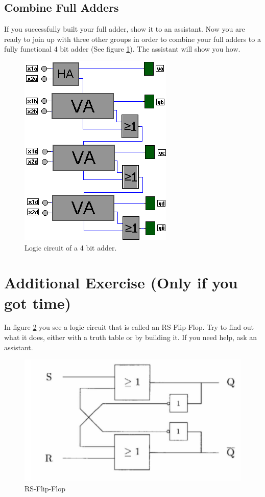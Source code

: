 \documentclass[10pt,a4paper]{article}
\begin{document}
\subsection{Combine Full Adders}
If you successfully built your full adder, show it to an assistant. Now you are ready to join up with three other groups in order to combine your full adders to a fully functional 4 bit adder (See figure \ref{fig:4bit}). The assistant will show you how.
\begin{figure}[H]
	\centering		  
	\includegraphics[scale=0.5]{4bit}
	\caption{Logic circuit of a 4 bit adder.}
	\label{fig:4bit}
\end{figure}


\section{Additional Exercise (Only if you got time)}
In figure \ref{fig:RSFF} you see a logic circuit that is called an RS Flip-Flop. Try to find out what it does, either with a truth table or by building it. If you need help, ask an assistant.

\begin{figure}[H]
	\centering
	\includegraphics[height=0.35\textwidth]{RSFF}%
	\caption{RS-Flip-Flop}%
	\label{fig:RSFF}
\end{figure}
\end{document}
